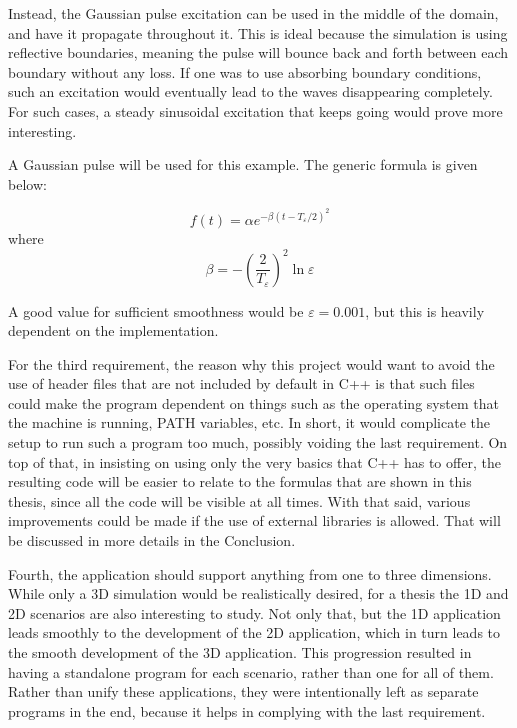 Instead, the Gaussian pulse excitation can be used in the middle of the domain, and have it propagate throughout it. This is ideal because the simulation is using reflective boundaries, meaning the pulse will bounce back and forth between each boundary without any loss. If one was to use absorbing boundary conditions, such an excitation would eventually lead to the waves disappearing completely. For such cases, a steady sinusoidal excitation that keeps going would prove more interesting.

A Gaussian pulse will be used for this example. The generic formula is given below:

\begin{equation}
	\label{eqn:gaussianPulse}
	f(t) = \alpha e^{-\beta(t - T_\varepsilon/2)^2}
\end{equation}
where
\begin{equation}
	\label{eqn:gaussianBeta}
	\beta = - (\frac{2}{T_\varepsilon})^2 \ln\varepsilon
\end{equation}

A good value for sufficient smoothness would be $\varepsilon = 0.001$, but this is heavily dependent on the implementation.

For the third requirement, the reason why this project would want to avoid the use of header files that are not included by default in C++ is that such files could make the program dependent on things such as the operating system that the machine is running, PATH variables, etc. In short, it would complicate the setup to run such a program too much, possibly voiding the last requirement. On top of that, in insisting on using only the very basics that C++ has to offer, the resulting code will be easier to relate to the formulas that are shown in this thesis, since all the code will be visible at all times. With that said, various improvements could be made if the use of external libraries is allowed. That will be discussed in more details in the Conclusion.

Fourth, the application should support anything from one to three dimensions. While only a 3D simulation would be realistically desired, for a thesis the 1D and 2D scenarios are also interesting to study. Not only that, but the 1D application leads smoothly to the development of the 2D application, which in turn leads to the smooth development of the 3D application. This progression resulted in having a standalone program for each scenario, rather than one for all of them. Rather than unify these applications, they were intentionally left as separate programs in the end, because it helps in complying with the last requirement.

